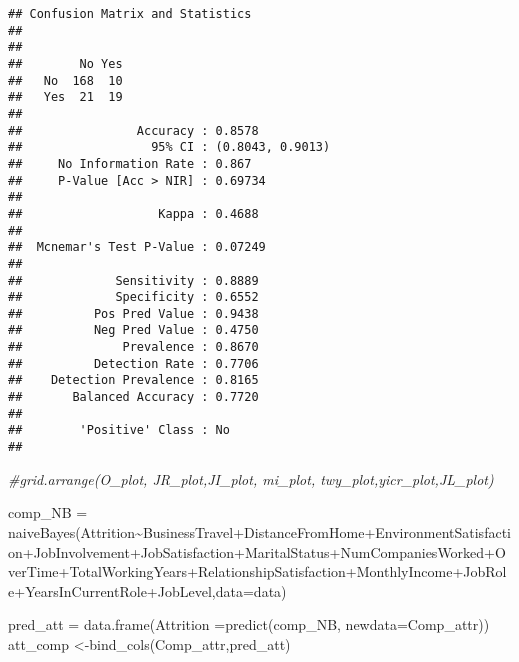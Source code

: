 \documentclass[
]{article}
\newenvironment{Shaded}{\begin{snugshade}}{\end{snugshade}}
\newcommand{\AttributeTok}[1]{\textcolor[rgb]{0.77,0.63,0.00}{#1}}
\newcommand{\CommentTok}[1]{\textcolor[rgb]{0.56,0.35,0.01}{\textit{#1}}}
\newcommand{\FunctionTok}[1]{\textcolor[rgb]{0.00,0.00,0.00}{#1}}
\newcommand{\NormalTok}[1]{#1}
\newcommand{\OtherTok}[1]{\textcolor[rgb]{0.56,0.35,0.01}{#1}}
\newcommand{\SpecialCharTok}[1]{\textcolor[rgb]{0.00,0.00,0.00}{#1}}
\begin{document}
\begin{verbatim}
## Confusion Matrix and Statistics
## 
##      
##        No Yes
##   No  168  10
##   Yes  21  19
##                                           
##                Accuracy : 0.8578          
##                  95% CI : (0.8043, 0.9013)
##     No Information Rate : 0.867           
##     P-Value [Acc > NIR] : 0.69734         
##                                           
##                   Kappa : 0.4688          
##                                           
##  Mcnemar's Test P-Value : 0.07249         
##                                           
##             Sensitivity : 0.8889          
##             Specificity : 0.6552          
##          Pos Pred Value : 0.9438          
##          Neg Pred Value : 0.4750          
##              Prevalence : 0.8670          
##          Detection Rate : 0.7706          
##    Detection Prevalence : 0.8165          
##       Balanced Accuracy : 0.7720          
##                                           
##        'Positive' Class : No              
## 
\end{verbatim}

\begin{Shaded}
\begin{Highlighting}[]
\CommentTok{\#grid.arrange(O\_plot, JR\_plot,JI\_plot, mi\_plot, twy\_plot,yicr\_plot,JL\_plot)}

\NormalTok{comp\_NB }\OtherTok{=} \FunctionTok{naiveBayes}\NormalTok{(Attrition}\SpecialCharTok{\textasciitilde{}}\NormalTok{BusinessTravel}\SpecialCharTok{+}\NormalTok{DistanceFromHome}\SpecialCharTok{+}\NormalTok{EnvironmentSatisfaction}\SpecialCharTok{+}\NormalTok{JobInvolvement}\SpecialCharTok{+}\NormalTok{JobSatisfaction}\SpecialCharTok{+}\NormalTok{MaritalStatus}\SpecialCharTok{+}\NormalTok{NumCompaniesWorked}\SpecialCharTok{+}\NormalTok{OverTime}\SpecialCharTok{+}\NormalTok{TotalWorkingYears}\SpecialCharTok{+}\NormalTok{RelationshipSatisfaction}\SpecialCharTok{+}\NormalTok{MonthlyIncome}\SpecialCharTok{+}\NormalTok{JobRole}\SpecialCharTok{+}\NormalTok{YearsInCurrentRole}\SpecialCharTok{+}\NormalTok{JobLevel,}\AttributeTok{data=}\NormalTok{data)}

\NormalTok{pred\_att }\OtherTok{=} \FunctionTok{data.frame}\NormalTok{(}\AttributeTok{Attrition =}\FunctionTok{predict}\NormalTok{(comp\_NB, }\AttributeTok{newdata=}\NormalTok{Comp\_attr))}
\NormalTok{att\_comp }\OtherTok{\textless{}{-}}\FunctionTok{bind\_cols}\NormalTok{(Comp\_attr,pred\_att)}
\end{Highlighting}
\end{Shaded}
\end{document}
